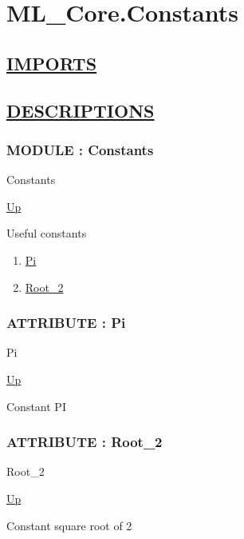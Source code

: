 \chapter*{ML\_Core.Constants}
\hypertarget{ecldoc:toc:ML_Core.Constants}{}

\section*{\underline{IMPORTS}}

\section*{\underline{DESCRIPTIONS}}
\subsection*{MODULE : Constants}
\hypertarget{ecldoc:ML_Core.Constants}{}
\begin{minipage}[t]{\textwidth}
\begin{flushleft}
 Constants 
\end{flushleft}
\end{minipage}
\hyperlink{ecldoc:toc:ML_Core}{Up}

\par
Useful constants
\par
\begin{enumerate}
\item \hyperlink{ecldoc:ml_core.constants.pi}{Pi}
\item \hyperlink{ecldoc:ml_core.constants.root_2}{Root\_2}
\end{enumerate}
\subsection*{ATTRIBUTE : Pi}
\hypertarget{ecldoc:ml_core.constants.pi}{}
\begin{minipage}[t]{\textwidth}
\begin{flushleft}
 Pi 
\end{flushleft}
\end{minipage}
\hyperlink{ecldoc:ML_Core.Constants}{Up}

\par
Constant PI
\par
\subsection*{ATTRIBUTE : Root\_2}
\hypertarget{ecldoc:ml_core.constants.root_2}{}
\begin{minipage}[t]{\textwidth}
\begin{flushleft}
 Root\_2 
\end{flushleft}
\end{minipage}
\hyperlink{ecldoc:ML_Core.Constants}{Up}

\par
Constant square root of 2
\par

